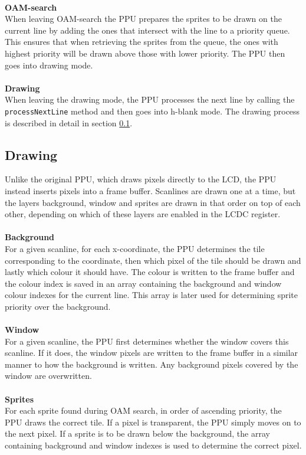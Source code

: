 \\
\textbf{OAM-search}\\
When leaving OAM-search the PPU prepares the sprites to be drawn on the current line by adding the ones that intersect with the line to a priority queue. This ensures that when retrieving the sprites from the queue, the ones with highest priority will be drawn above those with lower priority. The PPU then goes into drawing mode.\\
\\
\textbf{Drawing}\\
When leaving the drawing mode, the PPU processes the next line by calling the \texttt{processNextLine} method and then goes into h-blank mode. The drawing process is described in detail in section \ref{sec:result-drawing}.

\subsection{Drawing}
\label{sec:result-drawing}
Unlike the original PPU, which draws pixels directly to the LCD, the PPU instead inserts pixels into a frame buffer. Scanlines are drawn one at a time, but the layers background, window and sprites are drawn in that order on top of each other, depending on which of these layers are enabled in the LCDC register.\\
\\
\textbf{Background}\\
For a given scanline, for each x-coordinate, the PPU determines the tile corresponding to the coordinate, then which pixel of the tile should be drawn and lastly which colour it should have. The colour is written to the frame buffer and the colour index is saved in an array containing the background and window colour indexes for the current line. This array is later used for determining sprite priority over the background.\\
\\
\textbf{Window}\\
For a given scanline, the PPU first determines whether the window covers this scanline. If it does, the window pixels are written to the frame buffer in a similar manner to how the background is written. Any background pixels covered by the window are overwritten.\\
\\
\textbf{Sprites}\\
For each sprite found during OAM search, in order of ascending priority, the PPU draws the correct tile. If a pixel is transparent, the PPU simply moves on to the next pixel. If a sprite is to be drawn below the background, the array containing background and window indexes is used to determine the correct pixel.

